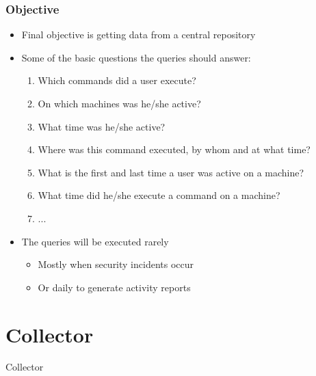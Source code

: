\documentclass{beamer}
\begin{document}
\begin{frame}[t]
\frametitle{Objective}
\begin{itemize}
\item Final objective is getting data from a central repository
\item Some of the basic questions the queries should answer:
\begin{enumerate}
	\item Which commands did a user execute?
	\item On which machines was he/she active?
	\item What time was he/she active?
	\item Where was this command executed, by whom and at what time?
	\item What is the first and last time a user was active on a machine?
	\item What time did he/she execute a command on a machine?
	\item ...
\end{enumerate}
\item The queries will be executed rarely
\begin{itemize}
	\item Mostly when security incidents occur
	\item Or daily to generate activity reports
\end{itemize}
\end{itemize}
\end{frame}

\section{Collector}
\begin{frame}[c]
\begin{center}
\Huge \textcolor{BrickRed}{Collector}
\end{center}
\end{frame}
\end{document}
